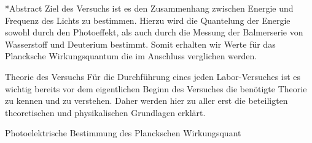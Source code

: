 \documentclass[pdftex, a4paper,11pt, twoside, ngerman]{report}
\begin{document}
  
  
  \begin{chapter}*{Abstract}
    Ziel des Versuchs ist es den Zusammenhang zwischen Energie und Frequenz des
    Lichts zu bestimmen. Hierzu wird die Quantelung der Energie sowohl durch 
    den Photoeffekt, als auch durch die Messung der Balmerserie von 
    Wasserstoff und Deuterium bestimmt. Somit erhalten wir Werte für das 
    Plancksche Wirkungsquantum die im Anschluss verglichen werden. 
  \end{chapter}
  
  \tableofcontents
  
  
  
  \begin{chapter}{Theorie des Versuchs}
    \label{chp:Theorie}
    Für die Durchführung eines jeden Labor-Versuches ist es wichtig bereits vor
    dem eigentlichen Beginn des Versuches die benötigte Theorie zu kennen und 
    zu verstehen. Daher werden hier zu aller erst die beteiligten 
    theoretischen und physikalischen Grundlagen erklärt.
    
    
    
    \begin{section}{Photoelektrische Bestimmung des Planckschen Wirkungsquant}
      \label{chp:TheoriePhotoelektrischesWirkungsquantum}
      
      
      

\end{section}
\end{chapter}
\end{document}
